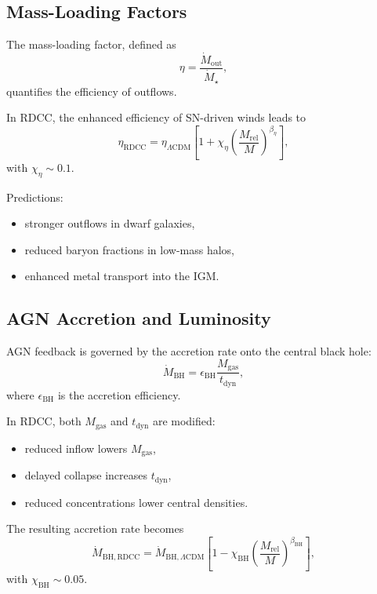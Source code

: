\documentclass[11pt,a4paper]{article}
\begin{document}
\subsection{Mass-Loading Factors}

The mass-loading factor, defined as
\begin{equation}
\eta
=
\frac{\dot{M}_{\mathrm{out}}}{\dot{M}_{\star}},
\end{equation}
quantifies the efficiency of outflows.

In RDCC, the enhanced efficiency of SN-driven winds leads to
\begin{equation}
\eta_{\mathrm{RDCC}}
=
\eta_{\Lambda\mathrm{CDM}}
\left[
1
+
\chi_{\eta}
\left(
\frac{M_{\mathrm{rel}}}{M}
\right)^{\beta_{\eta}}
\right],
\end{equation}
with $\chi_{\eta} \sim 0.1$.

Predictions:
\begin{itemize}
\item stronger outflows in dwarf galaxies,
\item reduced baryon fractions in low-mass halos,
\item enhanced metal transport into the IGM.
\end{itemize}

\subsection{AGN Accretion and Luminosity}

AGN feedback is governed by the accretion rate onto the central black hole:
\begin{equation}
\dot{M}_{\mathrm{BH}}
=
\epsilon_{\mathrm{BH}}
\frac{M_{\mathrm{gas}}}{t_{\mathrm{dyn}}},
\end{equation}
where $\epsilon_{\mathrm{BH}}$ is the accretion efficiency.

In RDCC, both $M_{\mathrm{gas}}$ and $t_{\mathrm{dyn}}$ are modified:
\begin{itemize}
\item reduced inflow lowers $M_{\mathrm{gas}}$,
\item delayed collapse increases $t_{\mathrm{dyn}}$,
\item reduced concentrations lower central densities.
\end{itemize}

The resulting accretion rate becomes
\begin{equation}
\dot{M}_{\mathrm{BH,RDCC}}
=
\dot{M}_{\mathrm{BH},\Lambda\mathrm{CDM}}
\left[
1
-
\chi_{\mathrm{BH}}
\left(
\frac{M_{\mathrm{rel}}}{M}
\right)^{\beta_{\mathrm{BH}}}
\right],
\end{equation}
with $\chi_{\mathrm{BH}} \sim 0.05$.
\end{document}
